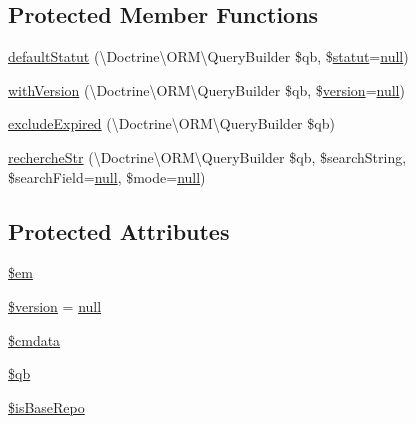 \subsection*{Protected Member Functions}
\begin{DoxyCompactItemize}
\item 
\hyperlink{class_acme_group_1_1_labo_bundle_1_1_entity_1_1base_repository_a2a5e6521d46a562c280148dfb7a681ba}{default\+Statut} (\textbackslash{}Doctrine\textbackslash{}\+O\+R\+M\textbackslash{}\+Query\+Builder \$qb, \$\hyperlink{class_acme_group_1_1_labo_bundle_1_1_entity_1_1statut}{statut}=\hyperlink{validate_8js_afb8e110345c45e74478894341ab6b28e}{null})
\item 
\hyperlink{class_acme_group_1_1_labo_bundle_1_1_entity_1_1base_repository_a742af6d9a48658da739000de766968a7}{with\+Version} (\textbackslash{}Doctrine\textbackslash{}\+O\+R\+M\textbackslash{}\+Query\+Builder \$qb, \$\hyperlink{class_acme_group_1_1_labo_bundle_1_1_entity_1_1version}{version}=\hyperlink{validate_8js_afb8e110345c45e74478894341ab6b28e}{null})
\item 
\hyperlink{class_acme_group_1_1_labo_bundle_1_1_entity_1_1base_repository_a438b0775492c29d4f80143b6fc30b882}{exclude\+Expired} (\textbackslash{}Doctrine\textbackslash{}\+O\+R\+M\textbackslash{}\+Query\+Builder \$qb)
\item 
\hyperlink{class_acme_group_1_1_labo_bundle_1_1_entity_1_1base_repository_ad535ddc7d9934a0b83c8a79ac23f60b2}{recherche\+Str} (\textbackslash{}Doctrine\textbackslash{}\+O\+R\+M\textbackslash{}\+Query\+Builder \$qb, \$search\+String, \$search\+Field=\hyperlink{validate_8js_afb8e110345c45e74478894341ab6b28e}{null}, \$mode=\hyperlink{validate_8js_afb8e110345c45e74478894341ab6b28e}{null})
\end{DoxyCompactItemize}
\subsection*{Protected Attributes}
\begin{DoxyCompactItemize}
\item 
\hyperlink{class_acme_group_1_1_labo_bundle_1_1_entity_1_1base_repository_a9a97fe6d7bd4c1283a7ba9439d01547e}{\$em}
\item 
\hyperlink{class_acme_group_1_1_labo_bundle_1_1_entity_1_1base_repository_a97ddd0d790492e38d0fb0be332917605}{\$version} = \hyperlink{validate_8js_afb8e110345c45e74478894341ab6b28e}{null}
\item 
\hyperlink{class_acme_group_1_1_labo_bundle_1_1_entity_1_1base_repository_a18ad9e0aa48ba9669a3d877521b728c3}{\$cmdata}
\item 
\hyperlink{class_acme_group_1_1_labo_bundle_1_1_entity_1_1base_repository_aa0bbe6a08ba9c0c8d2ca667370b83619}{\$qb}
\item 
\hyperlink{class_acme_group_1_1_labo_bundle_1_1_entity_1_1base_repository_aee16e3113fd1eb04c9dad54ccebe6fc2}{\$is\+Base\+Repo}
\end{DoxyCompactItemize}


